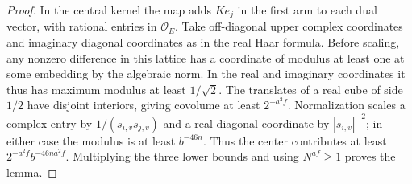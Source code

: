 \documentclass[a4paper,11pt]{article}
\theoremstyle{definition}
\theoremstyle{remark}
\numberwithin{equation}{section}
\begin{document}
\begin{proof}
In the central kernel the map adds \(K e_j\) in the first
arm to each dual vector, with rational entries in
\(\mathcal O_E\). Take off-diagonal upper complex coordinates
and imaginary diagonal coordinates as in the real Haar
formula. Before scaling, any nonzero difference in this
lattice has a coordinate of modulus at least one at some
embedding by the algebraic norm. In the real and imaginary
coordinates it thus has maximum modulus at least
\(1/\sqrt 2\). The translates of a real cube of side \(1/2\)
have disjoint interiors, giving covolume at least
\(2^{-a^2 f}\). Normalization scales a complex entry by
\(1/(s_{i,v}\bar s_{j,v})\) and a real diagonal coordinate by
\(|s_{i,v}|^{-2}\); in either case the modulus is at least
\(b^{-46n}\). Thus the center contributes at least
\(2^{-a^2f}b^{-46na^2 f}\). Multiplying the three lower
bounds and using \(N^{af}\ge1\) proves the lemma.
\end{proof}
\end{document}
